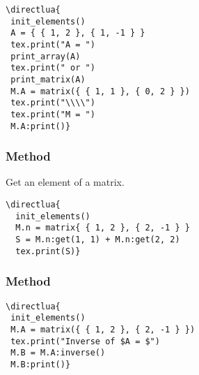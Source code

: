 \vspace{.5em}
\begin{minipage}{.5\textwidth}
\begin{verbatim}
\directlua{
 init_elements()
 A = { { 1, 2 }, { 1, -1 } }
 tex.print("A = ")
 print_array(A)
 tex.print(" or ")
 print_matrix(A)
 M.A = matrix({ { 1, 1 }, { 0, 2 } })
 tex.print("\\\\")
 tex.print("M = ")
 M.A:print()}
\end{verbatim}
\end{minipage}
 \begin{minipage}{.5\textwidth}
 \end{minipage}

\subsubsection{Method  }
\label{ssub:get_an_element_of_a_matrix}
Get an element of a matrix.


\begin{minipage}{.5\textwidth}
\begin{verbatim}
\directlua{
  init_elements()
  M.n = matrix{ { 1, 2 }, { 2, -1 } }
  S = M.n:get(1, 1) + M.n:get(2, 2)
  tex.print(S)}
\end{verbatim}
\end{minipage}
\begin{minipage}{.5\textwidth}
\end{minipage}

\subsubsection{Method  }
\label{ssub:inverse_matrix}

\begin{minipage}{.6\textwidth}
\begin{verbatim}
\directlua{
 init_elements()
 M.A = matrix({ { 1, 2 }, { 2, -1 } })
 tex.print("Inverse of $A = $")
 M.B = M.A:inverse()
 M.B:print()}
\end{verbatim}
\end{minipage}
\begin{minipage}{.4\textwidth}
\end{minipage}

